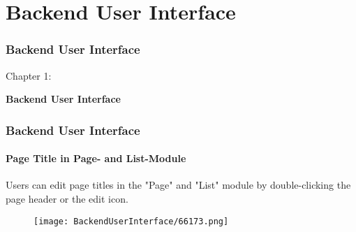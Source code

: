 %

\section{Backend User Interface}
\begin{frame}[fragile]
	\frametitle{Backend User Interface}

	\begin{center}\huge{Chapter 1:}\end{center}
	\begin{center}\huge{\color{typo3darkgrey}\textbf{Backend User Interface}}\end{center}

\end{frame}

\begin{frame}[fragile]
	\frametitle{Backend User Interface}
	\framesubtitle{Page Title in Page- and List-Module}

	Users can edit page titles in the "Page" and "List" module by double-clicking the page
	header or the edit icon.

	\begin{figure}
		\texttt{[image: BackendUserInterface/66173.png]}
	\end{figure}

\end{frame}

